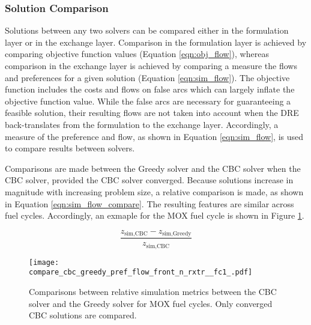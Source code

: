 
\subsubsection{Solution Comparison}

Solutions between any two solvers can be compared either in the formulation
layer or in the exchange layer. Comparison in the formulation layer is achieved
by comparing objective function values (Equation \ref{eqn:obj_flow}), whereas
comparison in the exchange layer is achieved by comparing a measure the flows
and preferences for a given solution (Equation \ref{eqn:sim_flow}). The
objective function includes the costs and flows on false arcs which can largely
inflate the objective function value. While the false arcs are necessary for
guaranteeing a feasible solution, their resulting flows are not taken into
account when the DRE back-translates from the formulation to the exchange
layer. Accordingly, a measure of the preference and flow, as shown in Equation
\ref{eqn:sim_flow}, is used to compare results between solvers. 


Comparisons are made between the Greedy solver and the CBC solver when the CBC
solver, provided the CBC solver converged. Because solutions increase in
magnitude with increasing problem size, a relative comparison is made, as shown
in Equation \ref{eqn:sim_flow_compare}. The resulting features are similar
across fuel cycles. Accordingly, an exmaple for the MOX fuel cycle is shown in
Figure \ref{fig:compare_cbc_greedy_pref_flow_front_n_rxtr__fc1_}.

\begin{equation}\label{eqn:sim_flow_compare}
\frac{z_{\text{sim}, \text{CBC}} - z_{\text{sim}, \text{Greedy}}}
     {z_{\text{sim}, \text{CBC}}} 
\end{equation}

\begin{figure}[h!]
  \begin{center}
    \texttt{[image: compare\_cbc\_greedy\_pref\_flow\_front\_n\_rxtr\_\_fc1\_.pdf]}
    \caption[]{
      \label{fig:compare_cbc_greedy_pref_flow_front_n_rxtr__fc1_}
      Comparisons between relative simulation metrics between the CBC solver and
      the Greedy solver for MOX fuel cycles. Only converged CBC
      solutions are compared.  }
  \end{center}
\end{figure}

